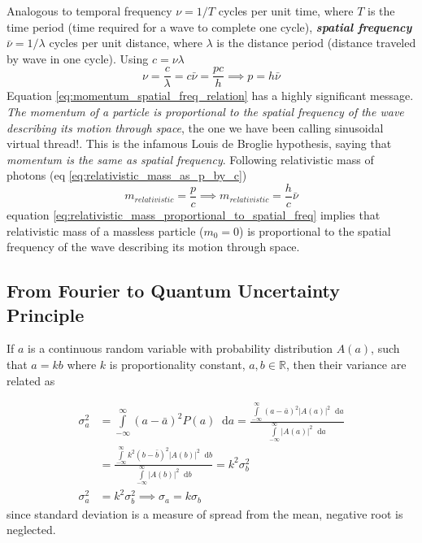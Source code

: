 \documentclass[11pt, a4paper]{article}
\newcommand{\variance}[1]{\sigma_{#1}^{2}}
\newcommand{\stdev}[1]{\sigma_{#1}}
\newcommand{\diff}{\mathop{}\!\mathrm{d}}
\newcommand{\dint}[2]{\int \limits_{#1}^{#2}}  %
\newcommand{\intinfty}{\dint{-\infty}{\infty}}	%
\begin{document}
Analogous to temporal frequency $\nu = 1/T$ cycles per unit time, where $T$ is the time period (time required for a wave to complete one cycle), \textbf{\textit{spatial frequency}} $\bar{\nu} = 1/ \lambda$ cycles per unit distance, where $\lambda$ is the distance period (distance traveled by wave in one cycle). Using $c=\nu \lambda$
\begin{equation}\label{eq:momentum_spatial_freq_relation}
	\nu = \frac{c}{\lambda} = c \bar{\nu} = \frac{pc}{h} \implies \boxed{p = h\bar{\nu}}
\end{equation}
Equation \eqref{eq:momentum_spatial_freq_relation} has a highly significant message. \textit{The momentum of a particle is proportional to the spatial frequency of the wave describing its motion through space}, the one we have been calling sinusoidal virtual thread!. This is the infamous Louis de Broglie hypothesis, saying that \textit{momentum is the same as spatial frequency}. Following relativistic mass of photons (eq \eqref{eq:relativistic_mass_as_p_by_c})
\begin{equation}\label{eq:relativistic_mass_proportional_to_spatial_freq}
		m_{relativistic} = \frac{p}{c} \implies \boxed{m_{relativistic} = \frac{h}{c}\bar{\nu}}
\end{equation}
equation \eqref{eq:relativistic_mass_proportional_to_spatial_freq} implies that relativistic mass of a massless particle ($m_{0}=0$) is proportional to the spatial frequency of the wave describing its motion through space.

\subsection{From Fourier to Quantum Uncertainty Principle}
If $a$ is a continuous random variable with probability distribution $A(a)$,  such that $a = kb$ where $k$ is proportionality constant, $a, b \in \mathbb{R}$, then their variance are related as

\begin{align}
	\variance{a} & = \intinfty (a - \bar{a})^{2} P(a) \diff a = \frac{\intinfty (a - \bar{a})^{2} |A(a)|^{2} \diff a}{\intinfty |A(a)|^{2} \diff a} \nonumber \\
	& = \frac{\intinfty k^{2}(b - \bar{b})^{2} |A(b)|^{2} \diff b}{\intinfty |A(b)|^{2} \diff b} = k^{2} \variance{b} \nonumber \\
	\variance{a} & = k^{2} \variance{b} \implies \boxed{\stdev{a} = k \stdev{b}} \label{eq:variance_of_proportional_quantities}
\end{align}
since standard deviation is a measure of spread from the mean, negative root is neglected.
\end{document}
